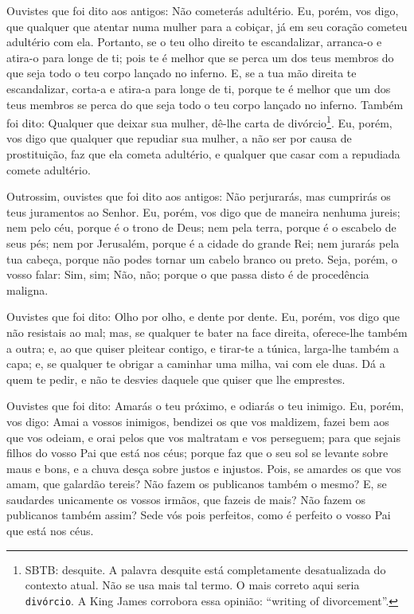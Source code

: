 Ouvistes que foi dito aos antigos: Não cometerás adultério.
Eu, porém, vos digo, que qualquer que atentar numa mulher
para a cobiçar, já em seu coração cometeu adultério com ela.
Portanto, se o teu olho direito te escandalizar, arranca-o e
atira-o para longe de ti; pois te é melhor que se perca um dos teus
membros do que seja todo o teu corpo lançado no inferno. E,
se a tua mão direita te escandalizar, corta-a e atira-a para longe
de ti, porque te é melhor que um dos teus membros se perca do que
seja todo o teu corpo lançado no inferno. Também foi dito:
Qualquer que deixar sua mulher, dê-lhe carta de
divórcio\footnote{SBTB: desquite. A palavra desquite está
completamente desatualizada do contexto atual. Não se usa mais tal
termo. O mais correto aqui seria \texttt{divórcio}. A King James
corrobora essa opinião: ``writing of divorcement''.}. Eu,
porém, vos digo que qualquer que repudiar sua mulher, a não ser por
causa de prostituição, faz que ela cometa adultério, e qualquer que
casar com a repudiada comete adultério.

Outrossim, ouvistes que foi dito aos antigos: Não perjurarás, mas
cumprirás os teus juramentos ao Senhor. Eu, porém, vos digo
que de maneira nenhuma jureis; nem pelo céu, porque é o trono de
Deus; nem pela terra, porque é o escabelo de seus pés; nem
por Jerusalém, porque é a cidade do grande Rei; nem jurarás
pela tua cabeça, porque não podes tornar um cabelo branco ou preto.
Seja, porém, o vosso falar: Sim, sim; Não, não; porque o que
passa disto é de procedência maligna.

Ouvistes que foi dito: Olho por olho, e dente por dente.
Eu, porém, vos digo que não resistais ao mal; mas, se
qualquer te bater na face direita, oferece-lhe também a outra;
e, ao que quiser pleitear contigo, e tirar-te a túnica,
larga-lhe também a capa; e, se qualquer te obrigar a caminhar
uma milha, vai com ele duas. Dá a quem te pedir, e não te
desvies daquele que quiser que lhe emprestes.

Ouvistes que foi dito: Amarás o teu próximo, e odiarás o teu
inimigo. Eu, porém, vos digo: Amai a vossos inimigos,
bendizei os que vos maldizem, fazei bem aos que vos odeiam, e orai
pelos que vos maltratam e vos perseguem; para que sejais filhos do
vosso Pai que está nos céus; porque faz que o seu sol se
levante sobre maus e bons, e a chuva desça sobre justos e injustos.
Pois, se amardes os que vos amam, que galardão tereis? Não
fazem os publicanos também o mesmo? E, se saudardes
unicamente os vossos irmãos, que fazeis de mais? Não fazem os
publicanos também assim? Sede vós pois perfeitos, como é
perfeito o vosso Pai que está nos céus.

